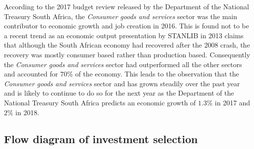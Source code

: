 \documentclass[letterpaper, 10 pt, conference]{ieeeconf}  %
\begin{document}
According to the 2017 budget review \cite{budgetReview} released by the Department of the National Treasury South Africa, the \textit{Consumer goods and services} sector was the main contributor to economic growth and job creation in 2016. This is found not to be a recent trend as an economic output presentation by STANLIB in 2013 \cite{stanlibReport} claims that although the South African economy had recovered after the 2008 crash, the recovery was mostly consumer based rather than production based. Consequently the \textit{Consumer goods and services} sector had outperformed all the other sectors and accounted for $70\%$ of the economy. This leads to the observation that the \textit{Consumer goods and services} sector and has grown steadily over the past year and is likely to continue to do so for the next year as the Department of the National Treasury South Africa predicts an economic growth of $1.3\%$ in 2017 and $2\%$ in 2018. 




\cleardoublepage
\appendix

\subsection{Flow diagram of investment selection}
\end{document}
